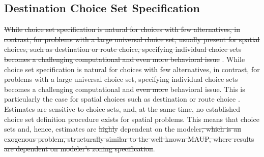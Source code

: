 \subsection{Destination Choice Set Specification}
\st{While choice set specification is natural for choices with few alternatives, in contrast, for problems with a large universal choice set, usually present for spatial choices, such as destination or route choice, specifying individual choice sets becomes a challenging computational and even more behavioral issue} \citep[e.g.,][]{PagliaraTimmermans_TransLett_2009, Thill_PHG_1992, Schuessler_PhDThesis_2010, FrejingerEtAl_TransResB_2009}. 
{\orange While choice set specification is natural for choices with few alternatives, in contrast, for problems with a large universal choice set, specifying individual choice sets becomes a challenging computational and \st{even more} behavioral issue.  This is particularly the case for spatial choices such as destination or route choice \citep[e.g.,][]{PagliaraTimmermans_TransLett_2009, Thill_PHG_1992, Schuessler_PhDThesis_2010, FrejingerEtAl_TransResB_2009}.} 
Estimates are sensitive to choice sets, and, at the same time, no established choice set definition procedure exists for spatial problems. 
This means that choice sets and, hence, estimates are \st{highly} dependent on the modeler\st{, which is an exogenous problem, structurally similar to the well-known %
MAUP, where results are dependent on modeler's zoning specification}.

